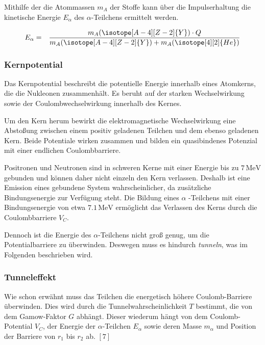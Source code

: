 \documentclass[12pt,a4paper]{scrartcl}
\numberwithin{equation}{section} %
\renewcommand{\[}{} %
\renewcommand{\]}{\noindent} %
\begin{document}
Mithilfe der die Atommassen \(m_{A}\) der Stoffe kann über die
Impulserhaltung die kinetische Energie \(E_\alpha\) des
\(\alpha\)-Teilchens ermittelt werden.

\[
\begin{eqnarray}
    E_\alpha
        &=& \frac{m_{A}(\isotope[A-4][Z-2]{Y}) \cdot Q}{m_{A}(\isotope[A-4][Z-2]{Y})+m_{A}(\isotope [4][2]{He})}
\end{eqnarray}
\]

\hypertarget{kernpotential}{%
\subsubsection{Kernpotential}\label{kernpotential}}

Das Kernpotential beschreibt die potentielle Energie innerhalb eines
Atomkerns, die die Nukleonen zusammenhält. Es beruht auf der starken
Wechselwirkung sowie der Coulombwechselwirkung innerhalb des Kernes.

Um den Kern herum bewirkt die elektromagnetische Wechselwirkung eine
Abstoßung zwischen einem positiv geladenen Teilchen und dem ebenso
geladenen Kern. Beide Potentiale wirken zusammen und bilden ein
quasibindenes Potenzial mit einer endlichen Coulombbarriere.

Positronen und Neutronen sind in schweren Kerne mit einer Energie bis zu
\(7\mathrm{\,MeV}\) gebunden und können daher nicht einzeln den Kern
verlassen. Deshalb ist eine Emission eines gebundene System
wahrscheinlicher, da zusätzliche Bindungsenergie zur Verfügung steht.
Die Bildung eines \(\alpha\) -Teilchens mit einer Bindungsenergie von
etwa \(7.1\mathrm{\,MeV}\) ermöglicht das Verlassen des Kerns durch die
Coulombbarriere \(V_C\).

Dennoch ist die Energie des \(\alpha\)-Teilchens nicht groß genug, um
die Potentialbarriere zu überwinden. Deswegen muss es hindurch
\emph{tunneln}, was im Folgenden beschrieben wird.

\hypertarget{tunneleffekt}{%
\subsubsection{Tunneleffekt}\label{tunneleffekt}}

Wie schon erwähnt muss das Teilchen die energetisch höhere
Coulomb-Barriere überwinden. Dies wird durch die
Tunnelwahrscheinlichkeit \(T\) bestimmt, die von dem Gamow-Faktor \(G\)
abhängt. Dieser wiederum hängt von dem Coulomb-Potential \(V_C\), der
Energie der \(\alpha\)-Teilchen \(E_\alpha\) sowie deren Masse
\(m_\alpha\) und Position der Barriere von \(r_1\) bis \(r_2\) ab.
\([7]\)
\end{document}
